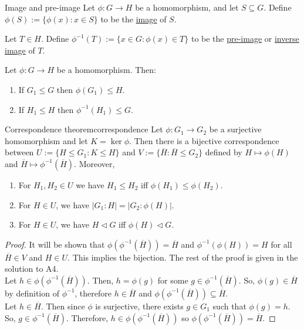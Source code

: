 \documentclass[12pt]{article}
\newcommand{\inv}{^{-1}}
\begin{document}
	\begin{mydef}{Image and pre-image}{}
		Let $\phi:G\to H$ be a homomorphism, and let $S\subseteq G$. Define $\phi(S):=\{\phi(x):x\in S\}$ to be the \underline{image} of $S$.
		
		Let $T\in H$. Define $\phi\inv(T):=\{x\in G:\phi(x)\in T\}$ to be the \underline{pre-image} or \underline{inverse image} of $T$.
	\end{mydef}
	
	\begin{mylem}{}{}
		Let $\phi:G\to H$ be a homomorphism. Then:
		\begin{enumerate}
			\item If $G_1\leq G$ then $\phi(G_1)\leq H$.
			\item If $H_1\leq H$ then $\phi\inv(H_1)\leq G$.
		\end{enumerate}
	\end{mylem}
	
	\begin{mythm}{Correspondence theorem}{correspondence}
		Let $\phi:G_1\to G_2$ be a surjective homomorphism and let $K=\ker\phi$. Then there is a bijective correspondence between $U:=\{H\leq G_1:K\leq H\}$ and $V:=\{\overline{H}:\overline{H}\leq G_2\}$ defined by $H\mapsto\phi(H)$ and $\overline{H}\mapsto\phi\inv(\overline{H})$. Moreover,
		\begin{enumerate}
			\item For $H_1, H_2\in U$ we have $H_1\leq H_2$ iff $\phi(H_1)\leq\phi(H_2)$.
			
			\item For $H\in U$, we have $|G_1:H|=|G_2:\phi(H)|$.
			
			\item For $H\in U$, we have $H\lhd G$ iff $\phi(H)\lhd G$.
		\end{enumerate}
		
		\begin{proof}
			It will be shown that $\phi(\phi\inv(\overline{H}))=\overline{H}$ and $\phi\inv(\phi(H))=H$ for all $\overline{H}\in V$ and $H\in U$. This implies the bijection. The rest of the proof is given in the solution to A4.\\
			
			Let $h\in\phi(\phi\inv(\overline{H}))$. Then, $h=\phi(g)$ for some $g\in\phi\inv(\overline{H})$. So, $\phi(g)\in\overline{H}$ by definition of $\phi\inv$, therefore $h\in\overline{H}$ and $\phi(\phi\inv(\overline{H}))\subseteq\overline{H}$.\\
			
			Let $h\in\overline{H}$. Then since $\phi$ is surjective, there exists $g\in G_1$ such that $\phi(g)=h$. So, $g\in\phi\inv(\overline{H})$. Therefore, $h\in\phi(\phi\inv(\overline{H}))$ so $\phi(\phi\inv(\overline{H}))=\overline{H}$.
		\end{proof}
	\end{mythm}
	
\end{document}

